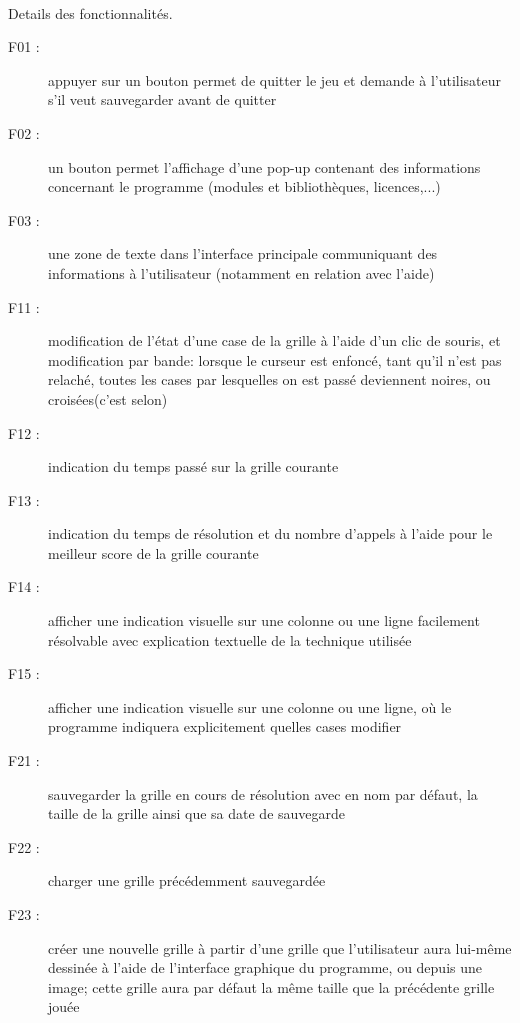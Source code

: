         \paragraph*{}
        Details des fonctionnalités.
        \begin{description}
                \item[F01 :] appuyer sur un bouton permet de quitter le jeu et demande à l'utilisateur s'il veut sauvegarder avant de quitter
                \item[F02 :] un bouton permet l'affichage d'une pop-up contenant des informations concernant le programme (modules et bibliothèques, licences,...)
                \item[F03 :] une zone de texte dans l'interface principale communiquant des informations à l'utilisateur (notamment en relation avec l'aide)
                \item[F11 :] modification de l'état d'une case de la grille à l'aide d'un clic de souris, et modification par bande: lorsque le curseur est enfoncé, tant qu'il n'est pas relaché, toutes les cases par lesquelles on est passé deviennent noires, ou croisées(c'est selon)\\
                \item[F12 :] indication du temps passé sur la grille courante
                \item[F13 :] indication du temps de résolution et du nombre d'appels à l'aide pour le meilleur score de la grille courante
                \item[F14 :] afficher une indication visuelle sur une colonne ou une ligne facilement résolvable avec explication textuelle de la technique utilisée
                \item[F15 :] afficher une indication visuelle sur une colonne ou une ligne, où le programme indiquera explicitement quelles cases modifier
                \item[F21 :] sauvegarder la grille en cours de résolution avec en nom par défaut, la taille de la grille ainsi que sa date de sauvegarde
                \item[F22 :] charger une grille précédemment sauvegardée
                \item[F23 :] créer une nouvelle grille  à partir d'une grille que l'utilisateur aura lui-même dessinée à l'aide  de l'interface graphique du programme, ou depuis une image; cette grille aura par défaut la même taille que la précédente grille jouée
        \end{description}


